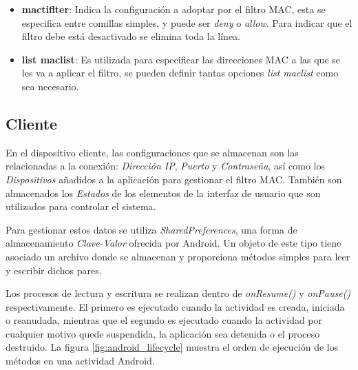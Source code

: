 \documentclass[12pt]{article}
\begin{document}
        \begin{itemize}
            \item \textbf{mactiflter}: Indica la configuración a adoptar por el filtro MAC, esta se especifica entre comillas simples, y puede ser \textit{deny} o \textit{allow}. Para indicar que el filtro debe está desactivado se elimina toda la línea.
            \item \textbf{list maclist}: Es utilizada para especificar las direcciones MAC a las que se les va a aplicar el filtro, se pueden definir tantas opciones \textit{list maclist} como sea necesario.
        \end{itemize}

    \subsection{Cliente}
        En el dispositivo cliente, las configuraciones que se almacenan son las relacionadas a la conexión: \textit{Dirección IP}, \textit{Puerto} y \textit{Contraseña}, así como los \textit{Dispositivos} añadidos a la aplicación para gestionar el filtro MAC. También son almacenados los \textit{Estados} de los elementos de la interfaz de usuario que son utilizados para controlar el sistema.

        Para gestionar estos datos se utiliza \textit{SharedPreferences}, una forma de almacenamiento \textit{Clave-Valor} ofrecida por Android. Un objeto de este tipo tiene asociado un archivo donde se almacenan y proporciona métodos simples para leer y escribir dichos pares.
        
        Los procesos de lectura y escritura se realizan dentro de \textit{onResume()} y \textit{onPause()} respectivamente. El primero es ejecutado cuando la actividad es creada, iniciada o reanudada, mientras que el segundo es ejecutado cuando la actividad por cualquier motivo quede suspendida, la aplicación sea detenida o el proceso destruido. La figura \ref{fig:android_lifecycle} muestra el orden de ejecución de los métodos en una actividad Android.
        
\end{document}
